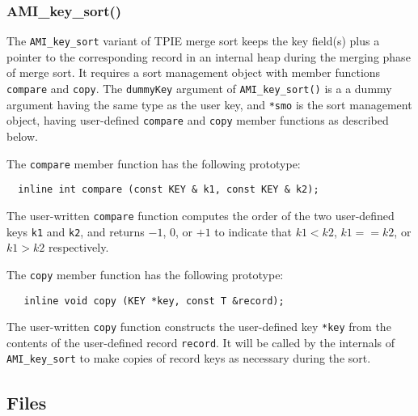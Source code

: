 \subsubsection{AMI\_key\_sort()}

The \lstinline|AMI_key_sort| variant of TPIE merge sort keeps the key
field(s) plus a pointer to the corresponding record in an internal
heap during the merging phase of merge sort.  It requires a sort
management object with member functions \lstinline|compare| and
\lstinline|copy|.  The \lstinline|dummyKey| argument of
\lstinline|AMI_key_sort()| is a a dummy argument having the same type
as the user key, and
\lstinline|*smo| is the sort management object, having user-defined
\lstinline|compare| and \lstinline|copy| member functions as described
below.

The \lstinline|compare| member function has the following
prototype:
\begin{lstlisting}
  inline int compare (const KEY & k1, const KEY & k2);
\end{lstlisting}

The user-written \lstinline|compare| function computes the order of
the two user-defined keys \lstinline|k1| and \lstinline|k2|, and
returns $-1$, $0$, or $+1$ to indicate that $k1<k2$, $k1==k2$, or
$k1>k2$ respectively.

The \lstinline|copy| member function has the following prototype:
\begin{lstlisting}
   inline void copy (KEY *key, const T &record);
\end{lstlisting}

The user-written \lstinline|copy| function constructs the user-defined
key \lstinline|*key| from the contents of the user-defined record
\lstinline|record|. It will be called by the internals of
\lstinline|AMI_key_sort| to make copies of record keys as necessary
during the sort.


\clearpage
 


\subsection{Files}
  \btabb
         {}
  \etabb

